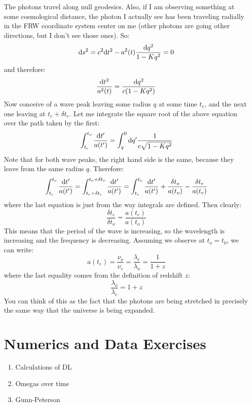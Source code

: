 \begin{enumerate}
The photons travel along null geodesics. Also, if I am observing
something at some cosmological distance, the photon I actually see has
been traveling radially in the FRW coordinate system center on me
(other photons are going other directions, but I don't see those
ones). So:
\begin{equation}
{\rm d}s^2 = c^2 {\rm d}t^2 - a^2(t) \frac{{\rm d}q^2}{1-Kq^2} = 0
\end{equation}
and therefore:
\begin{equation}
\frac{{\rm d}t^2}{a^2(t)} = \frac{{\rm d}q^2}{c(1-Kq^2)} 
\end{equation}
Now conceive of a wave peak leaving some radius $q$ at some
time $t_e$, and the next one leaving at $t_e+\delta t_e$. Let me
integrate the square root of the above equation over the path taken by
the first:
\begin{equation}
\int_{t_e}^{t_o} \frac{{\rm d}t'}{a(t')} = 
\int_q^0 {\rm d}q' 
\frac{1}{c\sqrt{1-Kq^2}} 
\end{equation}
Note that for both wave peaks, the right hand side is the same,
because they leave from the same radius $q$. Therefore:
\begin{equation}
\int_{t_e}^{t_o} \frac{{\rm d}t'}{a(t')} = 
\int_{t_e+\delta t_e}^{t_o+\delta t_o} \frac{{\rm d}t'}{a(t')} = 
\int_{t_e}^{t_o} \frac{{\rm d}t'}{a(t')} + \frac{\delta t_o}{a(t_o)} -
\frac{\delta t_e}{a(t_e)}
\end{equation}
where the last equation is just from the way integrals are defined.
Then clearly:
\begin{equation}
\frac{\delta t_e}{\delta t_o} = \frac{a(t_e)}{a(t_o)}
\end{equation}
This means that the period of the wave is increasing, so the
wavelength is increasing and the frequency is decreasing. Assuming we
observe at $t_o=t_0$, we can write:
\begin{equation}
a(t_e) = \frac{\nu_o}{\nu_e} = \frac{\lambda_e}{\lambda_o} =
\frac{1}{1+z} 
\end{equation}
where the last equality comes from the definition of redshift $z$:
\begin{equation}
\frac{\lambda_o}{\lambda_e} = 1+z 
\end{equation}
You can think of this as the fact that the photons are being stretched
in precisely the same way that the universe is being expanded.
\end{enumerate}

\section{Numerics and Data Exercises}

\begin{enumerate}
\item Calculations of DL
\item Omegas over time
\item Gunn-Peterson
\end{enumerate}


  
